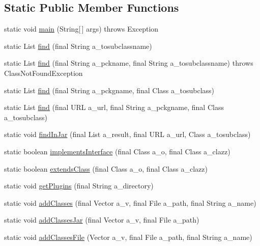 \subsection*{Static Public Member Functions}
\begin{DoxyCompactItemize}
\item 
static void \hyperlink{classorg_1_1jgap_1_1util_1_1_class_kit_aa2b281a15d71471b15810fbf81587fc2}{main} (String\mbox{[}$\,$\mbox{]} args)  throws Exception 
\item 
static List \hyperlink{classorg_1_1jgap_1_1util_1_1_class_kit_a2eb98cd025d7bb9755a162b9392fa5d6}{find} (final String a\-\_\-tosubclassname)
\item 
static List \hyperlink{classorg_1_1jgap_1_1util_1_1_class_kit_a74bdc6e5f9ee6a4593a007b979c1e7a5}{find} (final String a\-\_\-pckname, final String a\-\_\-tosubclassname)  throws Class\-Not\-Found\-Exception 
\item 
static List \hyperlink{classorg_1_1jgap_1_1util_1_1_class_kit_af422020391bbc23d196aeddfa752e76d}{find} (final String a\-\_\-pckgname, final Class a\-\_\-tosubclass)
\item 
static List \hyperlink{classorg_1_1jgap_1_1util_1_1_class_kit_a2588544ca151013f32f2571746620eba}{find} (final U\-R\-L a\-\_\-url, final String a\-\_\-pckgname, final Class a\-\_\-tosubclass)
\item 
static void \hyperlink{classorg_1_1jgap_1_1util_1_1_class_kit_a03374974cb1e241e6c9a3a60390ebde1}{find\-In\-Jar} (final List a\-\_\-result, final U\-R\-L a\-\_\-url, Class a\-\_\-tosubclass)
\item 
static boolean \hyperlink{classorg_1_1jgap_1_1util_1_1_class_kit_a3cbe0db83368d14b20a9f2183f3c637a}{implements\-Interface} (final Class a\-\_\-o, final Class a\-\_\-clazz)
\item 
static boolean \hyperlink{classorg_1_1jgap_1_1util_1_1_class_kit_a819363a1edce22437209324b781b1989}{extends\-Class} (final Class a\-\_\-o, final Class a\-\_\-clazz)
\item 
static void \hyperlink{classorg_1_1jgap_1_1util_1_1_class_kit_ab3cdf47ea2ab88910b62eb16425585b2}{get\-Plugins} (final String a\-\_\-directory)
\item 
static void \hyperlink{classorg_1_1jgap_1_1util_1_1_class_kit_a228f4f952302e46bf78abbb6ba4c96ba}{add\-Classes} (final Vector a\-\_\-v, final File a\-\_\-path, final String a\-\_\-name)
\item 
static void \hyperlink{classorg_1_1jgap_1_1util_1_1_class_kit_ab70d7c17d435f84073a70044f93c3168}{add\-Classes\-Jar} (final Vector a\-\_\-v, final File a\-\_\-path)
\item 
static void \hyperlink{classorg_1_1jgap_1_1util_1_1_class_kit_af1de54c5270228efc74e8002c9ffa31e}{add\-Classes\-File} (Vector a\-\_\-v, final File a\-\_\-path, final String a\-\_\-name)
\end{DoxyCompactItemize}
